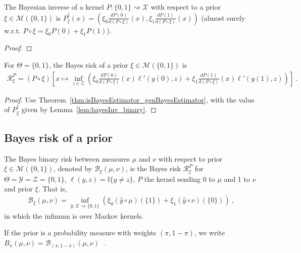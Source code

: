\begin{lemma}
  \label{lem:bayesInv_binary}
  \leanok
  The Bayesian inverse of a kernel $P : \{0,1\} \rightsquigarrow \mathcal X$ with respect to a prior $\xi \in \mathcal M(\{0,1\})$ is $P_\xi^\dagger(x) = \left(\xi_0\frac{d P(0)}{d(P \circ \xi)}(x), \xi_1\frac{d P(1)}{d(P \circ \xi)}(x)\right)$ (almost surely w.r.t. $P \circ \xi = \xi_0 P(0) + \xi_1 P(1)$).
\end{lemma}

\begin{proof}%
{}

\end{proof}

\begin{lemma}
  \label{lem:bayesRisk_binary}
  \leanok
  For $\Theta = \{0,1\}$, the Bayes risk of a prior $\xi \in \mathcal M(\{0,1\})$ is
  \begin{align*}
  \mathcal R^P_\xi = (P \circ \xi)\left[x \mapsto \inf_{z \in \mathcal Z} \left( \xi_0\frac{d P(0)}{d(P \circ \xi)}(x)\ell'(y(0), z) + \xi_1\frac{d P(1)}{d(P \circ \xi)}(x)\ell'(y(1), z) \right) \right]
  \: .
  \end{align*}
\end{lemma}

\begin{proof}\leanok
{}
Use Theorem~\ref{thm:isBayesEstimator_genBayesEstimator}, with the value of $P_\xi^\dagger$ given by Lemma~\ref{lem:bayesInv_binary}.
\end{proof}



\subsection{Bayes risk of a prior}

\begin{definition}
  \label{def:bayesBinaryRisk}
  \leanok
  The Bayes binary risk between measures $\mu$ and $\nu$ with respect to prior $\xi \in \mathcal M(\{0,1\})$, denoted by $\mathcal B_\xi(\mu, \nu)$, is the Bayes risk $\mathcal R^P_\xi$ for $\Theta = \mathcal Y = \mathcal Z = \{0,1\}$, $\ell(y,z) = \mathbb{I}\{y \ne z\}$, $P$ the kernel sending 0 to $\mu$ and 1 to $\nu$ and prior $\xi$.
  That is,
  \begin{align*}
  \mathcal B_\xi(\mu, \nu) = \inf_{\hat{y} : \mathcal X \rightsquigarrow \{0,1\}}\left(\xi_0 (\hat{y} \circ \mu)(\{1\}) + \xi_1 (\hat{y} \circ \nu)(\{0\})\right)
  \: ,
  \end{align*}
  in which the infimum is over Markov kernels.

  If the prior is a probability measure with weights $(\pi, 1 - \pi)$, we write $B_\pi(\mu, \nu) = \mathcal B_{(\pi, 1 - \pi)}(\mu, \nu)$~.
\end{definition}

